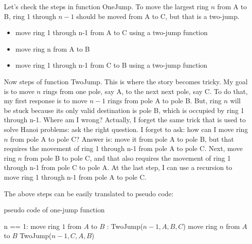 \documentclass[a4paper,11pt]{article}
\theoremstyle{mytheor}
\begin{document}
Let's check the steps in function OneJump. To move the largest ring $n$ from A to B, ring 1 through $n-1$ should be moved from A to C, but that is a two-jump.
\begin{itemize}
    \item move ring 1 through n-1 from A to C using a two-jump function
    \item move ring n from A to B
    \item move ring 1 through n-1 from C to B using a two-jump function
\end{itemize}

Now steps of function TwoJump. This is where the story becomes tricky. My goal is to move $n$ rings from one pole, say A, to the next next pole, say C.
To do that, my first response is to move $n-1$ rings from pole A to pole B. But, ring $n$ will be stuck because its only valid destination is pole B, which is occupied by ring 1 through n-1. Where am I wrong? Actually, I forget the same trick that is used to solve Hanoi problems: ask the right question. I forget to ask: how can I move ring $n$ from pole A to pole C? Answer is: move it from pole A to pole B, but that requires the movement of ring 1 through n-1 from pole A to pole C. Next, move ring $n$ from pole B to pole C, and that also requires the movement of ring 1 through n-1 from pole C to pole A. At the last step, I can use a recursion to move ring 1 through n-1 from pole A to pole C.

The above steps can be easily translated to pseudo code:
\iffalse
\begin{lstlisting}[label={list:eighth},caption=pseudo code of one-jump function.]
procedure OneJump(n, A, B, C);
  if n == 1:
    move ring 1 from A to B
  else:
    TwoJump(n-1, A, B, C)
    move ring n from A to B
    TwoJump(n-1, C, A, B)
\end{lstlisting}
\fi

\begin{algorithm}[H]
\caption{pseudo code of one-jump function}\label{OneJump}
\begin{algorithmic}[1]
  \If n == 1:
    \State move ring $1$ from $A$ to $B$
  \Else:
    \State TwoJump($n-1, A, B, C$)
    \State move ring $n$ from $A$ to $B$
    \State TwoJump($n-1, C, A, B$)
  \EndIf
\EndProcedure
\end{algorithmic}
\end{algorithm}

\iffalse
\begin{lstlisting}[label={list:eighth0},caption=pseudo code of two-jump function.]
procedure TwoJump(n, A, B, C); #{A is source and C is destination}
  if n == 1:
    move ring 1 from A to B;
    move ring 1 from B to C;
  else:
    TwoJump(n-1, A, B, C);
    move ring n from pole A to pole B;
    OneJump(n-1, C, A, B);
    move ring n from pole B to pole C;
    TwoJump(n-1, A, B, C);
\end{lstlisting}
\fi
\end{document}
